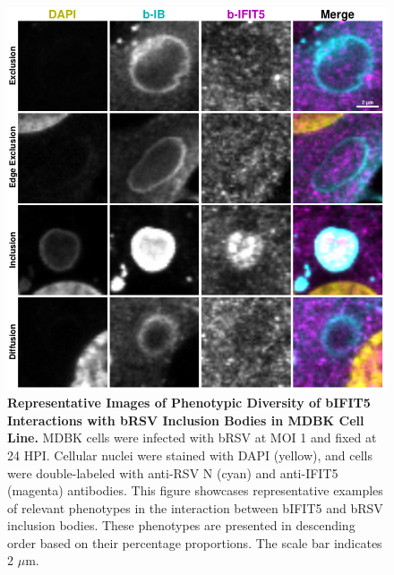 \begin{figure}
    \centering
    \includegraphics[width=1\linewidth]{08. Chapter 3/Figs/02. Infection/04. IFIT5/09. mdbk i5.pdf}
    \caption[Representative Images of Phenotypic Diversity of bIFIT5 Interactions with bRSV Inclusion Bodies in MDBK Cell Line.]{\textbf{Representative Images of Phenotypic Diversity of bIFIT5 Interactions with bRSV Inclusion Bodies in MDBK Cell Line.} MDBK cells were infected with bRSV at MOI 1 and fixed at 24 HPI. Cellular nuclei were stained with DAPI (yellow), and cells were double-labeled with anti-RSV N (cyan) and anti-IFIT5 (magenta) antibodies. This figure showcases representative examples of relevant phenotypes in the interaction between bIFIT5 and bRSV inclusion bodies. These phenotypes are presented in descending order based on their percentage proportions. The scale bar indicates 2 \(\mu \mbox{m}\).}
    \label{fig:Representative Images of Phenotypic Diversity of bIFIT5 Interactions with bRSV Inclusion Bodies in MDBK Cell Line}
\end{figure}

